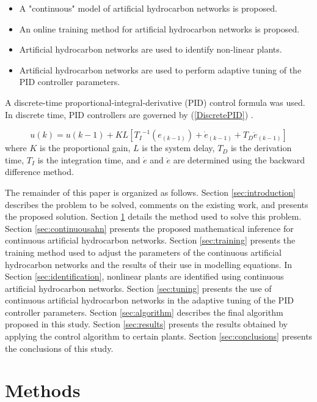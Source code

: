\documentclass{ieeeaccess}
\begin{document}
\begin{itemize}
\item A "continuous" model of artificial hydrocarbon networks is proposed.
\item An online training method for artificial hydrocarbon networks is proposed.
\item Artificial hydrocarbon networks are used to identify non-linear plants.
\item Artificial hydrocarbon networks are used to perform adaptive tuning of the PID controller parameters.
\end{itemize}

A discrete-time proportional-integral-derivative (PID) control formula was used. In discrete time, PID controllers are governed by (\ref{DiscretePID}) \cite{lee_adaptive_2020}.

\begin{equation}\label{DiscretePID}
 u(k)=u(k-1)+KL[{T_I}^{-1}(e_{(k-1)})+{\dot{e}}_{(k-1)}+T_D{\ddot{e}}_{(k-1)}]
\end{equation}
where \(K\) is the proportional gain, \(L\) is the system delay, \(T_D\) is the derivation time, \(T_I\) is the integration time, and \(\dot{ e}\) and \(\ddot{e}\) are determined using the backward difference method.

The remainder of this paper is organized as follows. Section \ref{sec:introduction} describes the problem to be solved, comments on the existing work, and presents the proposed solution. Section \ref{sec:methods} details the method used to solve this problem. Section \ref{sec:continuousahn} presents the proposed mathematical inference for continuous artificial hydrocarbon networks. Section \ref{sec:training} presents the training method used to adjust the parameters of the continuous artificial hydrocarbon networks and the results of their use in modelling equations. In Section \ref{sec:identification}, nonlinear plants are identified using continuous artificial hydrocarbon networks. Section \ref{sec:tuning}  presents the use of continuous artificial hydrocarbon networks in the adaptive tuning of the PID controller parameters.  Section \ref{sec:algorithm} describes the final algorithm proposed in this study. Section \ref{sec:results} presents the results obtained by applying  the control algorithm to certain plants. Section \ref{sec:conclusions} presents the  conclusions of this study.

\section{Methods}
\label{sec:methods}
\end{document}
